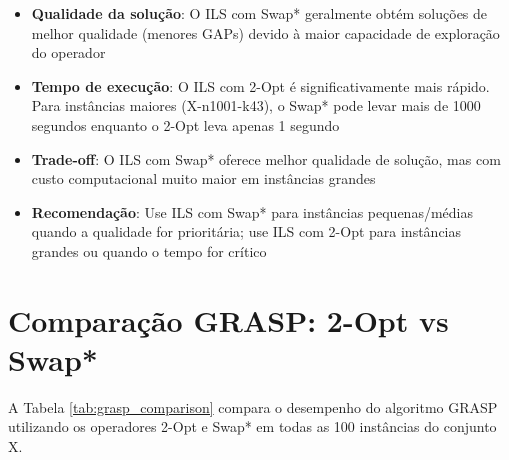 \documentclass[12pt,a4paper]{article}
\begin{document}
\begin{itemize}
    \item \textbf{Qualidade da solução}: O ILS com Swap* geralmente obtém soluções de melhor qualidade (menores GAPs) devido à maior capacidade de exploração do operador
    \item \textbf{Tempo de execução}: O ILS com 2-Opt é significativamente mais rápido. Para instâncias maiores (X-n1001-k43), o Swap* pode levar mais de 1000 segundos enquanto o 2-Opt leva apenas 1 segundo
    \item \textbf{Trade-off}: O ILS com Swap* oferece melhor qualidade de solução, mas com custo computacional muito maior em instâncias grandes
    \item \textbf{Recomendação}: Use ILS com Swap* para instâncias pequenas/médias quando a qualidade for prioritária; use ILS com 2-Opt para instâncias grandes ou quando o tempo for crítico
\end{itemize}

\clearpage

\section{Comparação GRASP: 2-Opt vs Swap*}

A Tabela \ref{tab:grasp_comparison} compara o desempenho do algoritmo GRASP utilizando os operadores 2-Opt e Swap* em todas as 100 instâncias do conjunto X.
\end{document}

